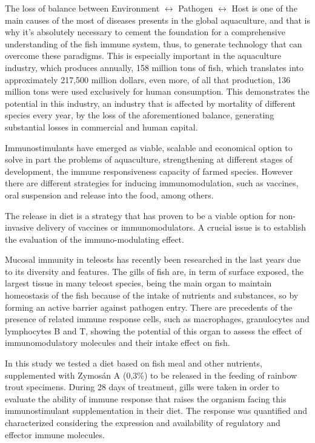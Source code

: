 \documentclass[12pt,letterpaper,oneside]{scrbook}
\begin{document}
The loss of balance between Environment \(\leftrightarrow\) Pathogen
\(\leftrightarrow\) Host is one of the main causes of the most of
diseases presents in the global aquaculture, and that is why it's
absolutely necessary to cement the foundation for a comprehensive
understanding of the fish immune system, thus, to generate technology
that can overcome these paradigms. This is especially important in the
aquaculture industry, which produces annually, 158 million tons of fish,
which translates into approximately 217,500 million dollars, even more,
of all that production, 136 million tons were used exclusively for human
consumption. This demonstrates the potential in this industry, an
industry that is affected by mortality of different species every year,
by the loss of the aforementioned balance, generating substantial losses
in commercial and human capital.

Immunostimulants have emerged as viable, scalable and economical option
to solve in part the problems of aquaculture, strengthening at different
stages of development, the immune responsiveness capacity of farmed
species. However there are different strategies for inducing
immunomodulation, such as vaccines, oral suspension and release into the
food, among others.

The release in diet is a strategy that has proven to be a viable option
for non-invasive delivery of vaccines or immunomodulators. A crucial
issue is to establish the evaluation of the immuno-modulating effect.

Mucosal immunity in teleosts has recently been researched in the last
years due to its diversity and features. The gills of fish are, in term
of surface exposed, the largest tissue in many teleost species, being
the main organ to maintain homeostasis of the fish because of the intake
of nutrients and substances, so by forming an active barrier against
pathogen entry. There are precedents of the presence of related immune
response cells, such as macrophages, granulocytes and lymphocytes B and
T, showing the potential of this organ to assess the effect of
immunomodulatory molecules and their intake effect on fish.

In this study we tested a diet based on fish meal and other nutrients,
supplemented with Zymosán A (0,3\%) to be released in the feeding of
rainbow trout specimens. During 28 days of treatment, gills were taken
in order to evaluate the ability of immune response that raises the
organism facing this immunostimulant supplementation in their diet. The
response was quantified and characterized considering the expression and
availability of regulatory and effector immune molecules.
\end{document}
